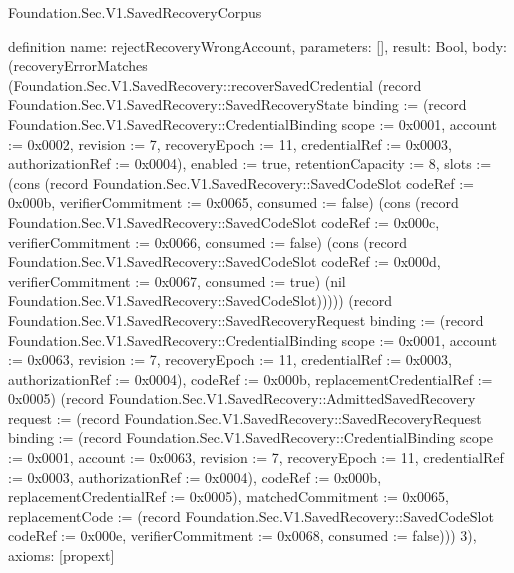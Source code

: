\begin{lexlean}{Foundation.Sec.V1.SavedRecoveryCorpus}
\begin{semanticmodule}
definition{
  name: rejectRecoveryWrongAccount,
  parameters: [],
  result: Bool,
  body: (recoveryErrorMatches (Foundation.Sec.V1.SavedRecovery::recoverSavedCredential (record Foundation.Sec.V1.SavedRecovery::SavedRecoveryState {binding := (record Foundation.Sec.V1.SavedRecovery::CredentialBinding {scope := 0x0001, account := 0x0002, revision := 7, recoveryEpoch := 11, credentialRef := 0x0003, authorizationRef := 0x0004}), enabled := true, retentionCapacity := 8, slots := (cons (record Foundation.Sec.V1.SavedRecovery::SavedCodeSlot {codeRef := 0x000b, verifierCommitment := 0x0065, consumed := false}) (cons (record Foundation.Sec.V1.SavedRecovery::SavedCodeSlot {codeRef := 0x000c, verifierCommitment := 0x0066, consumed := false}) (cons (record Foundation.Sec.V1.SavedRecovery::SavedCodeSlot {codeRef := 0x000d, verifierCommitment := 0x0067, consumed := true}) (nil Foundation.Sec.V1.SavedRecovery::SavedCodeSlot))))}) (record Foundation.Sec.V1.SavedRecovery::SavedRecoveryRequest {binding := (record Foundation.Sec.V1.SavedRecovery::CredentialBinding {scope := 0x0001, account := 0x0063, revision := 7, recoveryEpoch := 11, credentialRef := 0x0003, authorizationRef := 0x0004}), codeRef := 0x000b, replacementCredentialRef := 0x0005}) (record Foundation.Sec.V1.SavedRecovery::AdmittedSavedRecovery {request := (record Foundation.Sec.V1.SavedRecovery::SavedRecoveryRequest {binding := (record Foundation.Sec.V1.SavedRecovery::CredentialBinding {scope := 0x0001, account := 0x0063, revision := 7, recoveryEpoch := 11, credentialRef := 0x0003, authorizationRef := 0x0004}), codeRef := 0x000b, replacementCredentialRef := 0x0005}), matchedCommitment := 0x0065, replacementCode := (record Foundation.Sec.V1.SavedRecovery::SavedCodeSlot {codeRef := 0x000e, verifierCommitment := 0x0068, consumed := false})})) 3),
  axioms: [propext]
}


\end{semanticmodule}
\end{lexlean}
